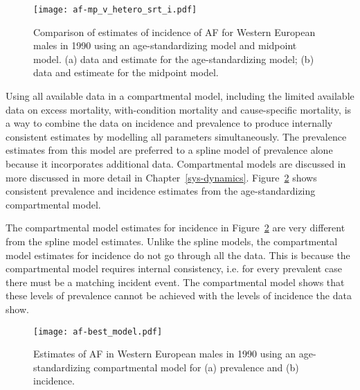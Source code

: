     \begin{figure}[h]
        \begin{center}
            \texttt{[image: af-mp\_v\_hetero\_srt\_i.pdf]}
            \caption{Comparison of estimates of incidence of AF for
              Western European males in 1990 using an
              age-standardizing model and midpoint model. (a) data and
              estimate for the age-standardizing model; (b) data and
              estimeate for the midpoint model.}
            \label{fig:app-af srt i}
        \end{center}
    \end{figure}

Using all available data in a compartmental model, including the
limited available data on excess mortality, with-condition mortality
and cause-specific mortality, is a way to combine the data on
incidence and prevalence to produce internally consistent estimates by
modelling all parameters simultaneously.  The prevalence estimates
from this model are preferred to a spline model of prevalence alone
because it incorporates additional data.  Compartmental models are
discussed in more discussed in more detail in
Chapter~\ref{sys-dynamics}.  Figure~\ref{fig:app-af age-stand} shows
consistent prevalence and incidence estimates from the
age-standardizing compartmental model.

The compartmental model estimates for incidence in
Figure~\ref{fig:app-af age-stand} are very different from the spline
model estimates.  Unlike the spline models, the compartmental model
estimates for incidence do not go through all the data.  This is
because the compartmental model requires internal consistency,
i.e. for every prevalent case there must be a matching incident event.
The compartmental model shows that these levels of prevalence cannot
be achieved with the levels of incidence the data show.

    \begin{figure}[h]
        \begin{center}
            \texttt{[image: af-best\_model.pdf]}
            \caption[Estimates of AF in Western European males in 1990
              using an age-standardizing compartmental
              model]{Estimates of AF in Western European males in 1990
              using an age-standardizing compartmental model for (a)
              prevalence and (b) incidence.}
            \label{fig:app-af age-stand}
        \end{center}
    \end{figure}

